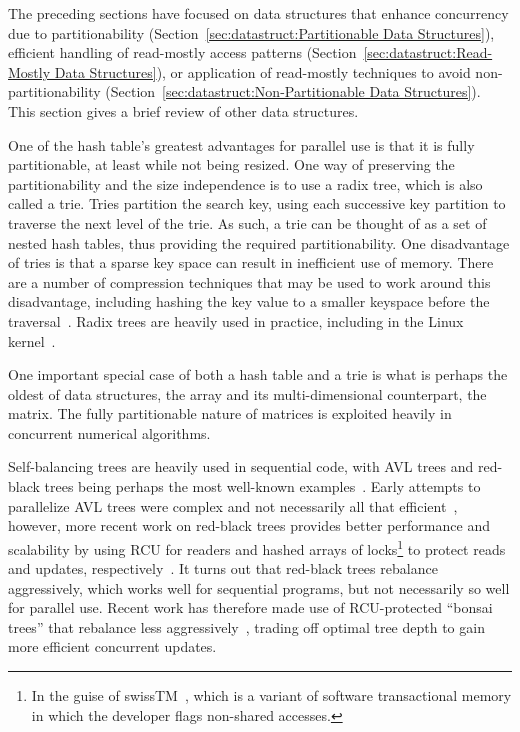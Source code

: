 The preceding sections have focused on data structures that enhance
concurrency due to partitionability
(Section~\ref{sec:datastruct:Partitionable Data Structures}),
efficient handling of read-mostly access patterns
(Section~\ref{sec:datastruct:Read-Mostly Data Structures}),
or application of read-mostly techniques to avoid
non-partitionability
(Section~\ref{sec:datastruct:Non-Partitionable Data Structures}).
This section gives a brief review of other data structures.

One of the hash table's greatest advantages for parallel use is that it
is fully partitionable, at least while not being resized.
One way of preserving the partitionability and the size independence is
to use a radix tree, which is also called a trie.
Tries partition the search key, using each successive key partition
to traverse the next level of the trie.
As such, a trie can be thought of as a set of nested hash tables,
thus providing the required partitionability.
One disadvantage of tries is that a sparse key space can result in
inefficient use of memory.
There are a number of compression techniques that may be used to
work around this disadvantage, including hashing the key value to
a smaller keyspace before the
traversal~\cite{RobertOlsson2006a}.
Radix trees are heavily used in practice, including in the Linux
kernel~\cite{NickPiggin2006radixtree}.

One important special case of both a hash table and a trie is what is
perhaps the oldest of data structures, the array and its multi-dimensional
counterpart, the matrix.
The fully partitionable nature of matrices is exploited heavily in
concurrent numerical algorithms.

Self-balancing trees are heavily used in sequential code, with
AVL trees and red-black trees being perhaps the most well-known
examples~\cite{ThomasHCorman2001Algorithms}.
Early attempts to parallelize AVL trees were complex and not necessarily
all that efficient~\cite{Ellis80},
however, more recent work on red-black trees provides better
performance and scalability by using RCU for readers and hashed arrays
of locks\footnote{
	In the guise of swissTM~\cite{AleksandarDragovejic2011STMnotToy},
	which is a variant of software transactional memory in which
	the developer flags non-shared accesses.}
to protect reads and updates,
respectively~\cite{PhilHoward2011RCUTMRBTree,PhilipWHoward2013RCUrbtree}.
It turns out that red-black trees rebalance aggressively, which works
well for sequential programs, but not necessarily so well for parallel
use.
Recent work has therefore made use of RCU-protected ``bonsai trees''
that rebalance less aggressively~\cite{AustinClements2012RCULinux:mmapsem},
trading off optimal tree depth to gain more efficient concurrent updates.

